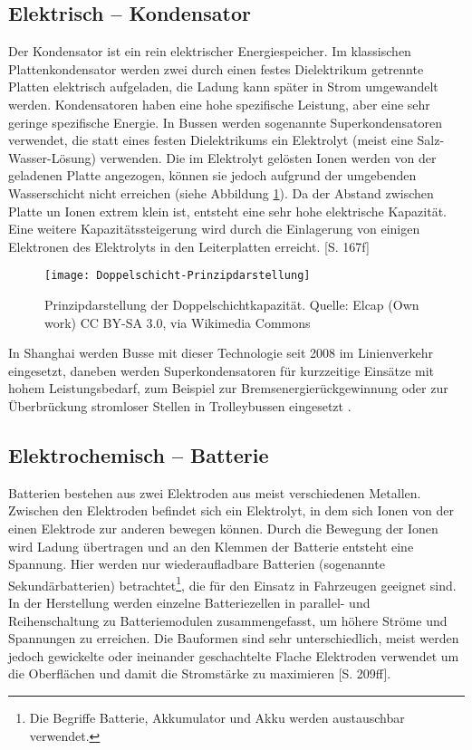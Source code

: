\subsection{Elektrisch – Kondensator} %
Der Kondensator ist ein rein elektrischer Energiespeicher. Im klassischen Plattenkondensator werden zwei durch einen festes Dielektrikum getrennte Platten elektrisch aufgeladen, die Ladung kann später in Strom umgewandelt werden. Kondensatoren haben eine hohe spezifische Leistung, aber eine sehr geringe spezifische Energie. In Bussen werden sogenannte Superkondensatoren verwendet, die statt eines festen Dielektrikums ein Elektrolyt (meist eine Salz-Wasser-Lösung) verwenden. Die im Elektrolyt gelösten Ionen werden von der geladenen Platte angezogen, können sie jedoch aufgrund der umgebenden Wasserschicht nicht erreichen (siehe Abbildung \ref{abb_doppelschicht}). Da der Abstand zwischen Platte un Ionen extrem klein ist, entsteht eine sehr hohe elektrische Kapazität. Eine weitere Kapazitätssteigerung wird durch die Einlagerung von einigen Elektronen des Elektrolyts in den Leiterplatten erreicht. \cite{Sterner:2014}[S. 167f]\\
\begin{figure}\centering
	 \texttt{[image: Doppelschicht-Prinzipdarstellung]}
	 \caption{Prinzipdarstellung der Doppelschichtkapazität. Quelle: Elcap (Own work) CC BY-SA 3.0, via Wikimedia Commons}
	 \label{abb_doppelschicht}
\end{figure}
In Shanghai werden Busse mit dieser Technologie seit 2008 im Linienverkehr eingesetzt, daneben werden Superkondensatoren für kurzzeitige Einsätze mit hohem Leistungsbedarf, zum Beispiel zur Bremsenergierückgewinnung oder zur Überbrückung stromloser Stellen in Trolleybussen eingesetzt \cite{Barminer-Busgesellschaft:2012}.
\subsection{Elektrochemisch – Batterie} %
Batterien bestehen aus zwei Elektroden aus meist verschiedenen Metallen. Zwischen den Elektroden befindet sich ein Elektrolyt, in dem sich Ionen von der einen Elektrode zur anderen bewegen können. Durch die Bewegung der Ionen wird Ladung übertragen und an den Klemmen der Batterie entsteht eine Spannung. Hier werden nur wiederaufladbare Batterien (sogenannte Sekundärbatterien) betrachtet\footnote{Die Begriffe Batterie, Akkumulator und Akku werden austauschbar verwendet.}, die für den Einsatz in Fahrzeugen geeignet sind. In der Herstellung werden einzelne Batteriezellen in parallel- und Reihenschaltung zu Batteriemodulen zusammengefasst, um höhere Ströme und Spannungen zu erreichen. Die Bauformen sind sehr unterschiedlich, meist werden jedoch gewickelte oder ineinander geschachtelte Flache Elektroden verwendet um die Oberflächen und damit die Stromstärke zu maximieren \cite{Sterner:2014}[S. 209ff].
